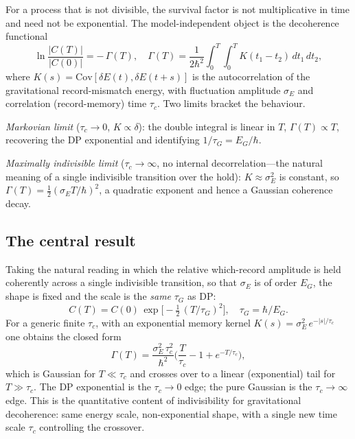 \documentclass[aps,pra,preprint,amsmath,amssymb,nofootinbib,superscriptaddress]{revtex4-2}
\begin{document}
For a process that is not divisible, the survival factor is not multiplicative in
time and need not be exponential. The model-independent object is the
decoherence functional \cite{breuerbook2002,breuer2016}
\begin{equation}
\ln\frac{|C(T)|}{|C(0)|}=-\,\Gamma(T),\quad
\Gamma(T)=\frac{1}{2\hbar^2}\int_0^T\!\!\int_0^T K(t_1-t_2)\,dt_1\,dt_2,
\label{eq:functional}
\end{equation}
where $K(s)=\mathrm{Cov}[\delta E(t),\delta E(t+s)]$ is the autocorrelation of
the gravitational record-mismatch energy, with fluctuation amplitude $\sigma_E$
and correlation (record-memory) time $\tau_c$. Two limits bracket the behaviour.

\emph{Markovian limit} ($\tau_c\to0$, $K\propto\delta$): the double integral is
linear in $T$, $\Gamma(T)\propto T$, recovering the DP exponential and
identifying $1/\tau_G=E_G/\hbar$.

\emph{Maximally indivisible limit} ($\tau_c\to\infty$, no internal
decorrelation---the natural meaning of a single indivisible transition over the
hold): $K\approx\sigma_E^2$ is constant, so
$\Gamma(T)=\tfrac12(\sigma_E T/\hbar)^2$, a quadratic exponent and hence a
Gaussian coherence decay.

\subsection{The central result}

Taking the natural reading in which the relative which-record amplitude is held
coherently across a single indivisible transition, so that $\sigma_E$ is of order
$E_G$, the shape is fixed and the scale is the \emph{same} $\tau_G$ as DP:
\begin{equation}
\boxed{\;C(T)=C(0)\,\exp\!\Big[-\tfrac12\,(T/\tau_G)^2\Big],\quad
\tau_G=\hbar/E_G.\;}
\label{eq:central}
\end{equation}
For a generic finite $\tau_c$, with an exponential memory kernel
$K(s)=\sigma_E^2\,e^{-|s|/\tau_c}$ one obtains the closed form
\begin{equation}
\Gamma(T)=\frac{\sigma_E^2\,\tau_c^2}{\hbar^2}
\Big(\frac{T}{\tau_c}-1+e^{-T/\tau_c}\Big),
\label{eq:crossover}
\end{equation}
which is Gaussian for $T\ll\tau_c$ and crosses over to a linear (exponential)
tail for $T\gg\tau_c$. The DP exponential is the $\tau_c\to0$ edge; the pure
Gaussian is the $\tau_c\to\infty$ edge. This is the quantitative content of
indivisibility for gravitational decoherence: same energy scale, non-exponential
shape, with a single new time scale $\tau_c$ controlling the crossover.
\end{document}
